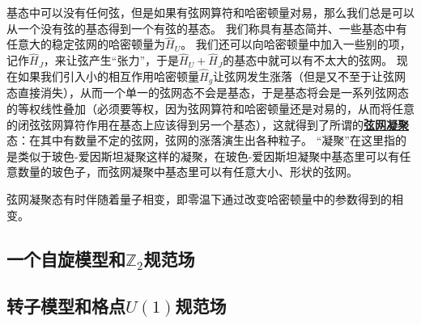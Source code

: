 \documentclass[hyperref, UTF8, a4paper]{ctexart}
\newcommand*{\concept}[1]{\underline{\textbf{#1}}}
\begin{document}
基态中可以没有任何弦，但是如果有弦网算符和哈密顿量对易，那么我们总是可以从一个没有弦的基态得到一个有弦的基态。
我们称具有基态简并、一些基态中有任意大的稳定弦网的哈密顿量为$\hat{H}_U$。
我们还可以向哈密顿量中加入一些别的项，记作$\hat{H}_J$，来让弦产生“张力”，于是$\hat{H}_U+\hat{H}_J$的基态中就可以有不太大的弦网。
现在如果我们引入小的相互作用哈密顿量$\hat{H}_g$让弦网发生涨落（但是又不至于让弦网态直接消失），从而一个单一的弦网态不会是基态，于是基态将会是一系列弦网态的等权线性叠加（必须要等权，因为弦网算符和哈密顿量还是对易的，从而将任意的闭弦弦网算符作用在基态上应该得到另一个基态），这就得到了所谓的\concept{弦网凝聚}态：在其中有数量不定的弦网，弦网的涨落演生出各种粒子。
“凝聚”在这里指的是类似于玻色-爱因斯坦凝聚这样的凝聚，在玻色-爱因斯坦凝聚中基态里可以有任意数量的玻色子，而弦网凝聚中基态里可以有任意大小、形状的弦网。

弦网凝聚态有时伴随着量子相变，即零温下通过改变哈密顿量中的参数得到的相变。

\subsection{一个自旋模型和$\mathbb{Z}_2$规范场}



\subsection{转子模型和格点$U(1)$规范场}

\subsection{}
\end{document}
